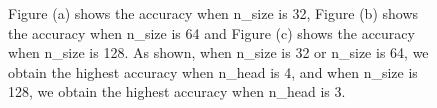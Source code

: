 \documentclass[10pt, conference, compsocconf]{IEEEtran}
\begin{document}
\begin{figure}[h]
	
	\subfigcapskip=5pt
	\centering
	\caption{Figure (a) shows the accuracy when n\_size is 32, Figure (b) shows the accuracy when n\_size is 64 and Figure (c) shows the accuracy when n\_size is 128. As shown, when n\_size is 32 or n\_size is 64, we obtain the highest accuracy when n\_head is 4, and when n\_size is 128, we obtain the highest accuracy when n\_head is 3.}
	\label{HeadResult}
\end{figure}
\end{document}
